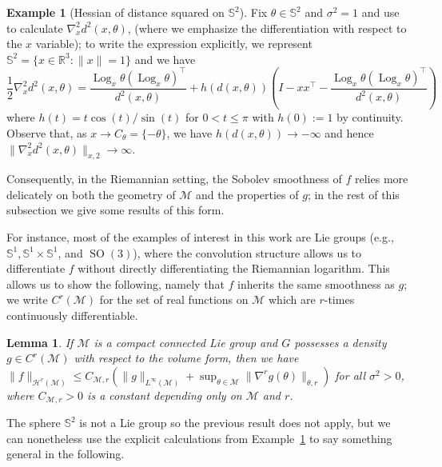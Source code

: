 \documentclass[preprint]{imsart}
\theoremstyle{plain}
\newtheorem{lemma}[theorem]{Lemma}
\theoremstyle{definition}
\newtheorem{example}[theorem]{Example}
\newcommand{\Rbb}{\mathbb{R}}
\newcommand{\Mcal}{\mathcal{M}}
\newcommand{\Hcal}{\mathcal{H}}
\DeclareMathOperator{\Log}{Log}
\DeclareMathOperator{\SO}{SO}
\begin{document}
\begin{example}[Hessian of distance squared on $\mathbb{S}^2$]\label{ex:sphere}
    Fix $\theta\in\mathbb{S}^2$ and $\sigma^2=1$ and  use \cite{PennecHessian} to calculate $\nabla_x^2d^2(x,\theta)$, (where we emphasize the differentiation with respect to the $x$ variable); to write the expression explicitly, we represent $\mathbb{S}^2 = \{x\in\Rbb^3:\|x\|=1\}$ and we have
    \begin{equation}\label{eqn:sphere-Hessian-sq-dist}
        \frac{1}{2}\nabla_x^2d^2(x,\theta) = \frac{\Log_x\theta (\Log_x\theta)^{\top}}{d^2(x,\theta)} + h(d(x,\theta))\left(I-xx^{\top}-\frac{\Log_x\theta (\Log_x\theta)^{\top}}{d^2(x,\theta)}\right)
    \end{equation}
    where $h(t) = t\cos(t)/\sin(t)$ for $0< t\le \pi$ with $h(0):=1$ by continuity.
    Observe that, as $x\to C_{\theta} = \{-\theta\}$, we have $h(d(x,\theta))\to -\infty$ and hence $\|\nabla_x^2d^2(x,\theta)\|_{x,2}\to \infty$.
\end{example}

Consequently, in the Riemannian setting, the Sobolev smoothness of $f$ relies more delicately on both the geometry of $\Mcal$ and the properties of $g$; in the rest of this subsection we give some results of this form.

For instance, most of the examples of interest in this work are Lie groups (e.g., $\mathbb{S}^1,\mathbb{S}^1\times\mathbb{S}^1$, and $\SO(3)$), where the convolution structure allows us to differentiate $f$ without directly differentiating the Riemannian logarithm.
This allows us to show the following, namely that $f$ inherits the same smoothness as $g$; we write $C^r(\Mcal)$ for the set of real functions on $\Mcal$ which are $r$-times continuously differentiable.

\begin{lemma}\label{lem:Sobolev-Lie}
    If $\Mcal$ is a compact connected Lie group and $G$ possesses a density $g\in C^r(\Mcal)$ with respect to the volume form, then we have $\|f\|_{\Hcal^r(\Mcal)} \le C_{\Mcal,r}(\|g\|_{L^{\infty}(\Mcal)}+\sup_{\theta\in\Mcal}\|\nabla^rg(\theta)\|_{\theta,r})$ for all $\sigma^2>0$, where $C_{\Mcal,r}>0$ is a constant depending only on $\Mcal$ and $r$.
\end{lemma}

The sphere $\mathbb{S}^2$ is not a Lie group so the previous result does not apply, but we can nonetheless use the explicit calculations from Example~\ref{ex:sphere} to say something general in the following.
\end{document}
